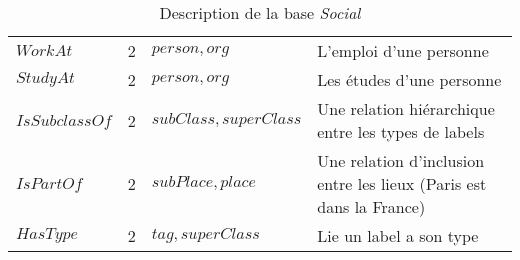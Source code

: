 \begin{table}[H]
\begin{adjustbox}{width=\linewidth}
\begin{tabular}{l|c|l|l}
            $WorkAt$ & 2 & $person, org$ & L'emploi d'une personne \\
            $StudyAt$ & 2 & $person, org$ & Les études d'une personne \\
            $IsSubclassOf$ & 2 & $subClass, superClass$ & Une relation hiérarchique entre les types de labels \\
            $IsPartOf$ & 2 & $subPlace, place$ & Une relation d'inclusion entre les lieux (Paris est dans la France) \\
            $HasType$ & 2 & $tag, superClass$ & Lie un label a son type \\
        \end{tabular}
    \end{adjustbox}
    \caption{Description de la base \textit{Social}}
\end{table}

